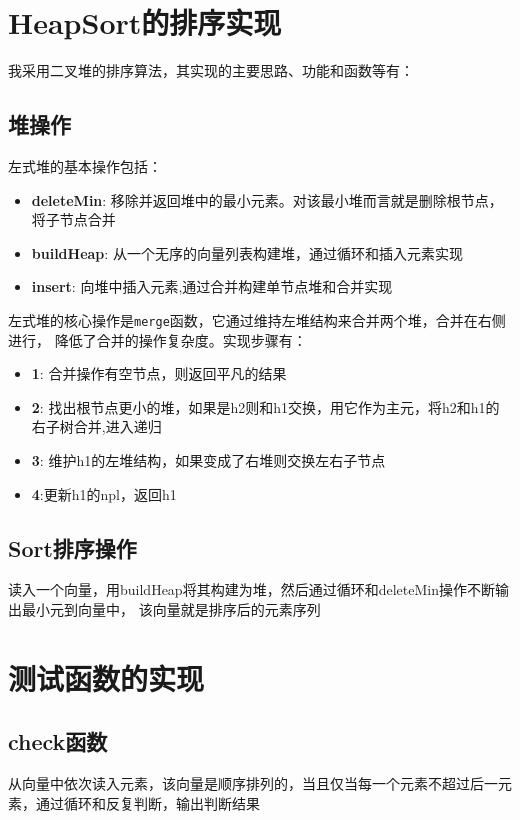 \documentclass[UTF8]{ctexart}
\begin{document}
\pagestyle{fancy}
\fancyhead{}

\section{HeapSort的排序实现}
我采用二叉堆的排序算法，其实现的主要思路、功能和函数等有：
\subsection{堆操作}
左式堆的基本操作包括：
\begin{itemize}
    \item \textbf{deleteMin}: 移除并返回堆中的最小元素。对该最小堆而言就是删除根节点，将子节点合并
    \item \textbf{buildHeap}: 从一个无序的向量列表构建堆，通过循环和插入元素实现
    \item \textbf{insert}: 向堆中插入元素,通过合并构建单节点堆和合并实现
\end{itemize}
左式堆的核心操作是\texttt{merge}函数，它通过维持左堆结构来合并两个堆，合并在右侧进行，
降低了合并的操作复杂度。实现步骤有：
\begin{itemize}
    \item \textbf{1}: 合并操作有空节点，则返回平凡的结果
    \item \textbf{2}: 找出根节点更小的堆，如果是h2则和h1交换，用它作为主元，将h2和h1的右子树合并,进入递归
    \item \textbf{3}: 维护h1的左堆结构，如果变成了右堆则交换左右子节点
    \item \textbf{4}:更新h1的npl，返回h1
\end{itemize}
\subsection{Sort排序操作}
读入一个向量，用buildHeap将其构建为堆，然后通过循环和deleteMin操作不断输出最小元到向量中，
该向量就是排序后的元素序列
\section{测试函数的实现}
\subsection{check函数}
从向量中依次读入元素，该向量是顺序排列的，当且仅当每一个元素不超过后一元素，通过循环和反复判断，输出判断结果
\end{document}
